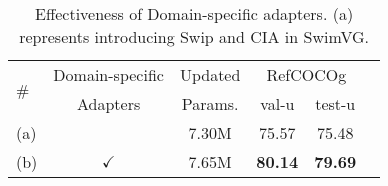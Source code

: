 \begin{table}[!t]
\centering
\renewcommand{\arraystretch}{1.5}
\caption{Effectiveness of Domain-specific adapters. (a) represents introducing Swip and CIA in SwimVG.}
\vspace{-2mm}
\label{Table:ablation on text adapter}
\small
\setlength{\tabcolsep}{10pt}


\begin{tabular}{l|c|c|ccc}
\toprule
    
 \multirow{2}{*}{\#} & {Domain-specific } & \multicolumn{1}{c|}{Updated} & \multicolumn{2}{c}{RefCOCOg} \\

 & Adapters& Params. & val-u & test-u  \\ \midrule

(a)  &  & 7.30M &  75.57 & 75.48  \\ 
\midrule
(b) & $\checkmark$ & 7.65M  &  \textbf{80.14}& \textbf{79.69}  \\


\bottomrule

\end{tabular}

\end{table}